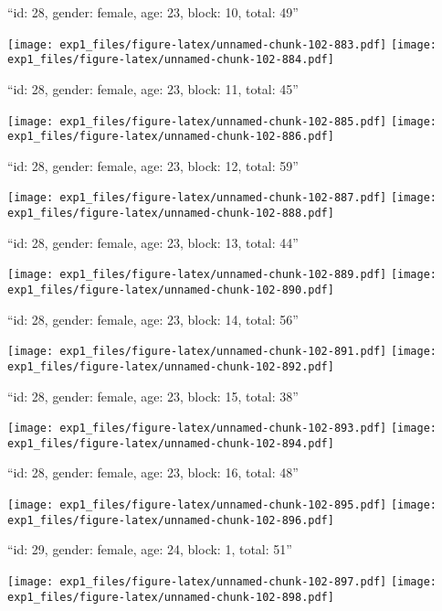 \documentclass[11pt,,]{article}
\begin{document}
\newpage
[1] 

``id: 28, gender: female, age: 23, block: 10, total: 49''

\texttt{[image: exp1\_files/figure-latex/unnamed-chunk-102-883.pdf]}
\texttt{[image: exp1\_files/figure-latex/unnamed-chunk-102-884.pdf]}

\newpage
[1] 

``id: 28, gender: female, age: 23, block: 11, total: 45''

\texttt{[image: exp1\_files/figure-latex/unnamed-chunk-102-885.pdf]}
\texttt{[image: exp1\_files/figure-latex/unnamed-chunk-102-886.pdf]}

\newpage
[1] 

``id: 28, gender: female, age: 23, block: 12, total: 59''

\texttt{[image: exp1\_files/figure-latex/unnamed-chunk-102-887.pdf]}
\texttt{[image: exp1\_files/figure-latex/unnamed-chunk-102-888.pdf]}

\newpage
[1] 

``id: 28, gender: female, age: 23, block: 13, total: 44''

\texttt{[image: exp1\_files/figure-latex/unnamed-chunk-102-889.pdf]}
\texttt{[image: exp1\_files/figure-latex/unnamed-chunk-102-890.pdf]}

\newpage
[1] 

``id: 28, gender: female, age: 23, block: 14, total: 56''

\texttt{[image: exp1\_files/figure-latex/unnamed-chunk-102-891.pdf]}
\texttt{[image: exp1\_files/figure-latex/unnamed-chunk-102-892.pdf]}

\newpage
[1] 

``id: 28, gender: female, age: 23, block: 15, total: 38''

\texttt{[image: exp1\_files/figure-latex/unnamed-chunk-102-893.pdf]}
\texttt{[image: exp1\_files/figure-latex/unnamed-chunk-102-894.pdf]}

\newpage
[1] 

``id: 28, gender: female, age: 23, block: 16, total: 48''

\texttt{[image: exp1\_files/figure-latex/unnamed-chunk-102-895.pdf]}
\texttt{[image: exp1\_files/figure-latex/unnamed-chunk-102-896.pdf]}

\newpage
[1] 

``id: 29, gender: female, age: 24, block: 1, total: 51''

\texttt{[image: exp1\_files/figure-latex/unnamed-chunk-102-897.pdf]}
\texttt{[image: exp1\_files/figure-latex/unnamed-chunk-102-898.pdf]}
\end{document}
